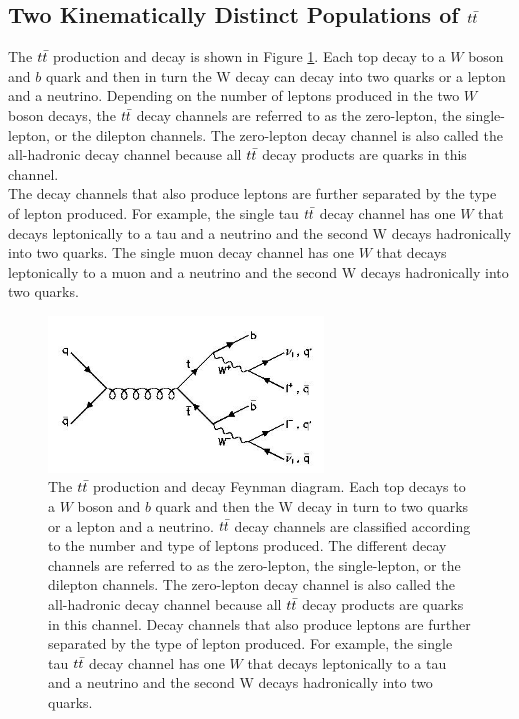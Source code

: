 \subsection{Two Kinematically Distinct Populations of $t\bar{t}$}
\label{sec:Bkg:ttbar:Pop}


\indent The $\ttbar$ production and decay is shown in Figure \ref{fig:ttbar:feynDiag}.  Each top decay to a $W$ boson and $b$ quark and then in turn the W decay can decay into two quarks or a lepton and a neutrino. Depending on the number of leptons produced in the two $W$ boson decays, the $\ttbar$ decay channels are referred to as the zero-lepton, the single-lepton, or the dilepton channels.  The zero-lepton decay channel is also called the all-hadronic decay channel because all $\ttbar$ decay products are quarks in this channel.  \\

\indent The decay channels that also produce leptons are further separated by the type of lepton produced.  For example, the single tau $\ttbar$ decay channel has one $W$ that decays leptonically to a tau and a neutrino and the second W decays hadronically into two quarks.  The single muon decay channel has one $W$ that decays leptonically to a muon and a neutrino and the second W decays hadronically into two quarks.  \\

\begin{figure}[h!]
  \centering
	\includegraphics[width=0.65\textwidth]{./figures/feynDiag/ttbar_decay.jpg}
	\caption[The $\ttbar$ production and decay Feynman diagram.]{ The $\ttbar$ production and decay Feynman diagram.  Each top decays to a $W$ boson and $b$ quark and then the W decay in turn to two quarks or a lepton and a neutrino. $\ttbar$ decay channels are classified according to the number and type of leptons produced. The different decay channels are referred to as the zero-lepton, the single-lepton, or the dilepton channels. The zero-lepton decay channel is also called the all-hadronic decay channel because all $\ttbar$ decay products are quarks in this channel.  Decay channels that also produce leptons are further separated by the type of lepton produced.  For example, the single tau $\ttbar$ decay channel has one $W$ that decays leptonically to a tau and a neutrino and the second W decays hadronically into two quarks. }
\label{fig:ttbar:feynDiag}
\end{figure}


